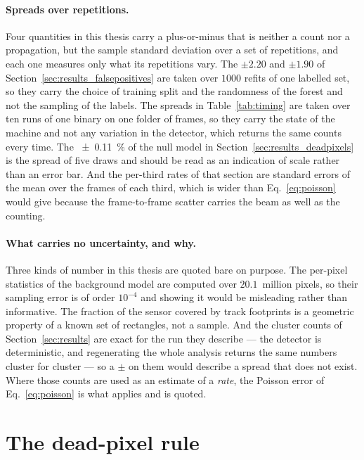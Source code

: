 \documentclass[a4paper,headsepline,oneside,11pt]{scrartcl}
\begin{document}
\paragraph{Spreads over repetitions.} Four quantities in this thesis carry a
plus-or-minus that is neither a count nor a propagation, but the sample standard
deviation over a set of repetitions, and each one measures only what its
repetitions vary. The $\pm 2.20$ and $\pm 1.90$ of
Section~\ref{sec:results_falsepositives} are taken over $1000$ refits of one
labelled set, so they carry the choice of training split and the randomness of
the forest and not the sampling of the labels. The spreads in
Table~\ref{tab:timing} are taken over ten runs of one binary on one folder of
frames, so they carry the state of the machine and not any variation in the
detector, which returns the same counts every time. The \SI{\pm0.11}{\percent} of the
null model in Section~\ref{sec:results_deadpixels} is the spread of five draws
and should be read as an indication of scale rather than an error bar. And the
per-third rates of that section are standard errors of the mean over the frames
of each third, which is wider than Eq.~\eqref{eq:poisson} would give because the
frame-to-frame scatter carries the beam as well as the counting.

\paragraph{What carries no uncertainty, and why.} Three kinds of number in this
thesis are quoted bare on purpose. The per-pixel statistics of the background
model are computed over $20.1$~million pixels, so their sampling error is of
order $10^{-4}$ and showing it would be misleading rather than informative. The
fraction of the sensor covered by track footprints is a geometric property of a
known set of rectangles, not a sample. And the cluster counts of
Section~\ref{sec:results} are exact for the run they describe --- the detector is
deterministic, and regenerating the whole analysis returns the same numbers
cluster for cluster --- so a $\pm$ on them would describe a spread that does not
exist. Where those counts are used as an estimate of a \emph{rate}, the Poisson
error of Eq.~\eqref{eq:poisson} is what applies and is quoted.

\clearpage
\section{The dead-pixel rule}
\label{app:deadpixel}
\end{document}
